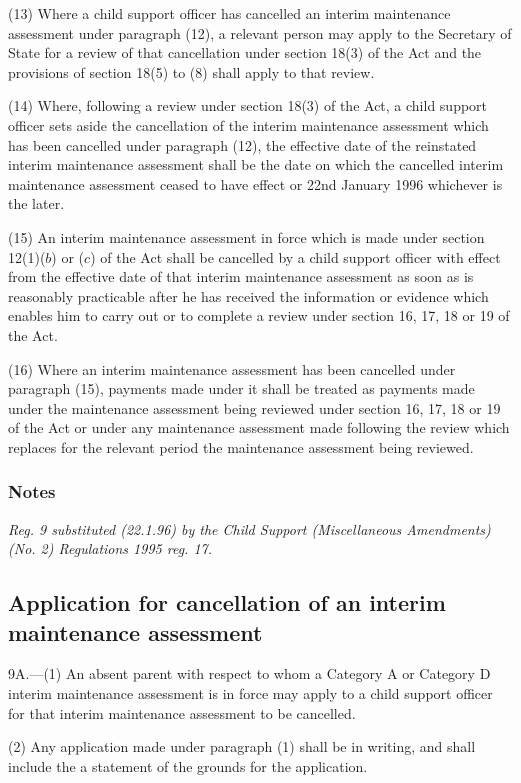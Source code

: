 \documentclass[a4paper]{article}
\newcommand\amendment[1]{\subsubsection*{Notes}{\itshape\frenchspacing\footnotesize #1 \par}}
\begin{document}
(13) Where a child support officer has cancelled an interim maintenance assessment under paragraph (12), a relevant person may apply to the Secretary of State for a review of that cancellation under section 18(3) of the Act and the provisions of section 18(5) to (8) shall apply to that review.

(14) Where, following a review under section 18(3) of the Act, a child support officer sets aside the cancellation of the interim maintenance assessment which has been cancelled under paragraph (12), the effective date of the reinstated interim maintenance assessment shall be the date on which the cancelled interim maintenance assessment ceased to have effect or 22nd January 1996 whichever is the later.

(15) An interim maintenance assessment in force which is made under section 12(1)($b$) or ($c$) of the Act shall be cancelled by a child support officer with effect from the effective date of that interim maintenance assessment as soon as is reasonably practicable after he has received the information or evidence which enables him to carry out or to complete a review under section 16, 17, 18 or 19 of the Act.

(16) Where an interim maintenance assessment has been cancelled under paragraph (15), payments made under it shall be treated as payments made under the maintenance assessment being reviewed under section 16, 17, 18 or 19 of the Act or under any maintenance assessment made following the review which replaces for the relevant period the maintenance assessment being reviewed.

\amendment{
Reg. 9 substituted (22.1.96) by the Child Support (Miscellaneous Amendments) (No. 2) Regulations 1995 reg. 17.
}

\subsection[9A. Application for cancellation of an interim maintenance assessment]{Application for cancellation of an interim maintenance assessment}

9A.—(1) An absent parent with respect to whom a Category A or Category D interim maintenance assessment is in force may apply to a child support officer for that interim maintenance assessment to be cancelled.

(2) Any application made under paragraph (1) shall be in writing, and shall include the a statement of the grounds for the application.
\end{document}

